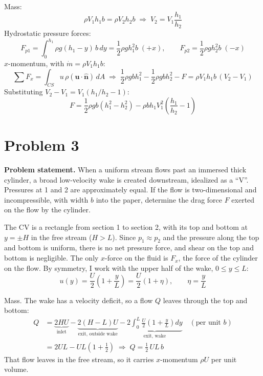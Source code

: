 \documentclass[11pt]{article}
\newcommand{\vect}[1]{\mathbf{#1}}
\begin{document}
\medskip
\noindent Mass:
\begin{equation*}
\rho V_1 h_1 b = \rho V_2 h_2 b
\;\Rightarrow\;
V_2 = V_1\frac{h_1}{h_2}
\end{equation*}
Hydrostatic pressure forces:
\begin{equation*}
F_{p1} = \int_0^{h_1}\rho g(h_1 - y)\,b\,dy = \frac12\rho g h_1^2 b \;(+x), \qquad
F_{p2} = \frac12\rho g h_2^2 b \;(-x)
\end{equation*}
$x$-momentum, with $\dot m = \rho V_1 h_1 b$:
\begin{equation*}
\sum F_x = \int_{CS} u\,\rho(\vect u\cdot\hat{\vect n})\,dA
\;\Rightarrow\;
\frac12\rho g b h_1^2 - \frac12\rho g b h_2^2 - F = \rho V_1 h_1 b\,(V_2 - V_1)
\end{equation*}
Substituting $V_2 - V_1 = V_1\left(h_1/h_2 - 1\right)$:
\begin{equation*}
\boxed{F = \frac12\rho g b\left(h_1^2 - h_2^2\right) - \rho b h_1 V_1^2\left(\frac{h_1}{h_2} - 1\right)}
\end{equation*}

\section*{Problem 3}

\noindent\textbf{Problem statement.} When a uniform stream flows past an immersed thick cylinder, a
broad low-velocity wake is created downstream, idealized as a ``V''. Pressures at 1 and 2 are
approximately equal. If the flow is two-dimensional and incompressible, with width $b$ into the
paper, determine the drag force $F$ exerted on the flow by the cylinder.

\medskip
\noindent The CV is a rectangle from section 1 to section 2, with its top and bottom at $y = \pm H$
in the free stream ($H > L$). Since $p_1 \approx p_2$ and the pressure along the top and bottom is
uniform, there is no net pressure force, and shear on the top and bottom is negligible. The only
$x$-force on the fluid is $F_x$, the force of the cylinder on the flow. By symmetry, I work with the
upper half of the wake, $0 \le y \le L$:
\begin{equation*}
u(y) = \frac{U}{2}\left(1 + \frac{y}{L}\right) = \frac{U}{2}(1+\eta), \qquad \eta = \frac{y}{L}
\end{equation*}

\medskip
\noindent Mass. The wake has a velocity deficit, so a flow $Q$ leaves through the top and bottom:
\begin{align*}
Q &= \underbrace{2HU}_{\text{inlet}} - \underbrace{2(H-L)U}_{\text{exit, outside wake}}
 - \underbrace{2\int_0^L \frac{U}{2}\left(1 + \frac{y}{L}\right)dy}_{\text{exit, wake}}
 \quad(\text{per unit } b) \\
&= 2UL - UL\left(1 + \frac12\right)
\;\Rightarrow\;
Q = \frac12\,U L\,b
\end{align*}
That flow leaves in the free stream, so it carries $x$-momentum $\rho U$ per unit volume.
\end{document}
